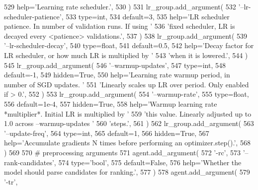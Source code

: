 \begin{DoxyCode}
529             help=\textcolor{stringliteral}{'Learning rate scheduler.'},
530         )
531         lr\_group.add\_argument(
532             \textcolor{stringliteral}{'--lr-scheduler-patience'},
533             type=int,
534             default=3,
535             help=\textcolor{stringliteral}{'LR scheduler patience. In number of validation runs. If using '}
536             \textcolor{stringliteral}{'fixed scheduler, LR is decayed every <patience> validations.'},
537         )
538         lr\_group.add\_argument(
539             \textcolor{stringliteral}{'--lr-scheduler-decay'},
540             type=float,
541             default=0.5,
542             help=\textcolor{stringliteral}{'Decay factor for LR scheduler, or how much LR is multiplied by '}
543             \textcolor{stringliteral}{'when it is lowered.'},
544         )
545         lr\_group.add\_argument(
546             \textcolor{stringliteral}{'--warmup-updates'},
547             type=int,
548             default=-1,
549             hidden=\textcolor{keyword}{True},
550             help=\textcolor{stringliteral}{'Learning rate warmup period, in number of SGD updates. '}
551             \textcolor{stringliteral}{'Linearly scales up LR over period. Only enabled if > 0.'},
552         )
553         lr\_group.add\_argument(
554             \textcolor{stringliteral}{'--warmup-rate'},
555             type=float,
556             default=1e-4,
557             hidden=\textcolor{keyword}{True},
558             help=\textcolor{stringliteral}{'Warmup learning rate *multiplier*. Initial LR is multiplied by '}
559             \textcolor{stringliteral}{'this value. Linearly adjusted up to 1.0 across --warmup-updates '}
560             \textcolor{stringliteral}{'steps.'},
561         )
562         lr\_group.add\_argument(
563             \textcolor{stringliteral}{'--update-freq'},
564             type=int,
565             default=1,
566             hidden=\textcolor{keyword}{True},
567             help=\textcolor{stringliteral}{'Accumulate gradients N times before performing an optimizer.step().'},
568         )
569 
570         \textcolor{comment}{# preprocessing arguments}
571         agent.add\_argument(
572             \textcolor{stringliteral}{'-rc'},
573             \textcolor{stringliteral}{'--rank-candidates'},
574             type=\textcolor{stringliteral}{'bool'},
575             default=\textcolor{keyword}{False},
576             help=\textcolor{stringliteral}{'Whether the model should parse candidates for ranking.'},
577         )
578         agent.add\_argument(
579             \textcolor{stringliteral}{'-tr'},

\end{DoxyCode}
